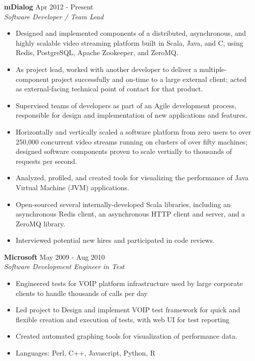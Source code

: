 \documentclass[line,margin]{res}
\begin{document}
\begin{resume}
    {\bf mDialog} \hfill Apr 2012 - Present \\
    {\sl Software Developer / Team Lead}
                 \begin{itemize}  \itemsep -2pt %
                 \item Designed and implemented components of a distributed, asynchronous, and highly scalable video streaming platform built in Scala, Java, and C, using Redis, PostgreSQL, Apache Zookeeper, and ZeroMQ.\item As project lead, worked with another developer to deliver a multiple-component project successfully and on-time to a large external client; acted as external-facing technical point of contact for that product.\item Supervised teams of developers as part of an Agile development process, responsible for design and implementation of new applications and features.\item Horizontally and vertically scaled a software platform from zero users to over 250,000 concurrent video streams running on clusters of over fifty machines; designed software components proven to scale vertially to thousands of requests per second.\item Analyzed, profiled, and created tools for visualizing the performance of Java Virtual Machine (JVM) applications.\item Open-sourced several internally-developed Scala libraries, including an asynchronous Redis client, an asynchronous HTTP client and server, and a ZeroMQ library.\item Interviewed potential new hires and participated in code reviews.
                \end{itemize}
  
    {\bf Microsoft} \hfill May 2009 - Aug 2010 \\
    {\sl Software Development Engineer in Test}
                 \begin{itemize}  \itemsep -2pt %
                 \item Engineered tests for VOIP platform infrastructure used by large corporate clients to handle thousands of calls per day\item Led project to Design and implement VOIP test framework for quick and flexible creation and execution of tests, with web UI for test reporting\item Created automated graphing tools for visualization of performance data.\item Languages: Perl, C++, Javascript, Python, R
                \end{itemize}
  

\end{resume}
\end{document}
